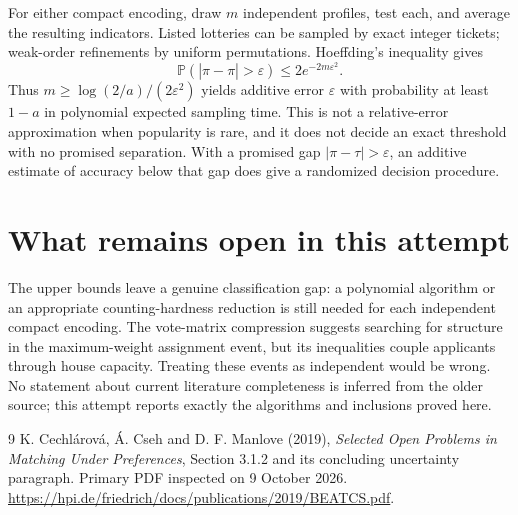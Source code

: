 \documentclass[11pt]{article}
\newcommand{\Prb}{\mathbb P}
\begin{document}
For either compact encoding, draw $m$ independent profiles, test each, and average the resulting indicators. Listed lotteries can be sampled by exact integer tickets; weak-order refinements by uniform permutations. Hoeffding's inequality gives
\[
 \Prb(|\widehat\pi-\pi|>\varepsilon)\leq2e^{-2m\varepsilon^2}.
\]
Thus $m\geq\log(2/a)/(2\varepsilon^2)$ yields additive error $\varepsilon$ with probability at least $1-a$ in polynomial expected sampling time. This is not a relative-error approximation when popularity is rare, and it does not decide an exact threshold with no promised separation. With a promised gap $|\pi-\tau|>\varepsilon$, an additive estimate of accuracy below that gap does give a randomized decision procedure.

\section*{What remains open in this attempt}
The upper bounds leave a genuine classification gap: a polynomial algorithm or an appropriate counting-hardness reduction is still needed for each independent compact encoding. The vote-matrix compression suggests searching for structure in the maximum-weight assignment event, but its inequalities couple applicants through house capacity. Treating these events as independent would be wrong. No statement about current literature completeness is inferred from the older source; this attempt reports exactly the algorithms and inclusions proved here.

\begin{thebibliography}{9}
 K. Cechl\'arov\'a, \'A. Cseh and D. F. Manlove (2019), \emph{Selected Open Problems in Matching Under Preferences}, Section 3.1.2 and its concluding uncertainty paragraph. Primary PDF inspected on 9 October 2026. \url{https://hpi.de/friedrich/docs/publications/2019/BEATCS.pdf}.
\end{thebibliography}
\end{document}

